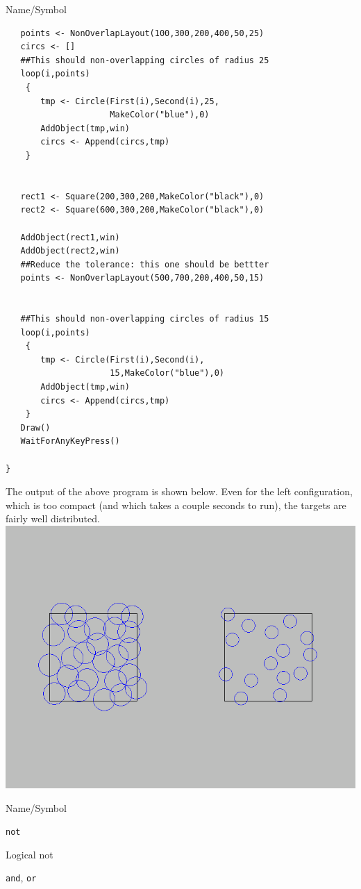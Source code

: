 \begin{desc}{Name/Symbol}
\begin{verbatim}
   points <- NonOverlapLayout(100,300,200,400,50,25)
   circs <- []
   ##This should non-overlapping circles of radius 25
   loop(i,points)
    {
       tmp <- Circle(First(i),Second(i),25,
                     MakeColor("blue"),0) 
       AddObject(tmp,win)
       circs <- Append(circs,tmp)
    }


   rect1 <- Square(200,300,200,MakeColor("black"),0)
   rect2 <- Square(600,300,200,MakeColor("black"),0)

   AddObject(rect1,win)
   AddObject(rect2,win)
   ##Reduce the tolerance: this one should be bettter
   points <- NonOverlapLayout(500,700,200,400,50,15)


   ##This should non-overlapping circles of radius 15
   loop(i,points)
    {
       tmp <- Circle(First(i),Second(i),
                     15,MakeColor("blue"),0) 
       AddObject(tmp,win)
	   circs <- Append(circs,tmp)
    }
   Draw()
   WaitForAnyKeyPress()

}
\end{verbatim}
\clearpage
The output of the above program is shown below.  Even for the left configuration, which is too compact (and which takes a couple seconds to run), the targets are fairly well distributed.
\includegraphics[scale=.35]{images/nonoverlap.png} 


\item[See Also]     

\end{desc}





\begin{desc}{Name/Symbol}
\item[Name/Symbol]	\verb+not+

\item[Description]	Logical not

\item[Usage]		

\item[Example]	

\item[See Also]	\verb+and+, \verb+or+
\end{desc}

